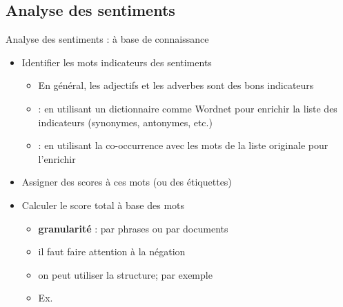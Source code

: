 \documentclass{KodeBook}
\begin{document}
\subsection{Analyse des sentiments}


Analyse des sentiments : à base de connaissance
\begin{itemize}
	\item Identifier les mots indicateurs des sentiments
	\begin{itemize}
		\item En général, les adjectifs et les adverbes sont des bons indicateurs
		\item {} : en utilisant un dictionnaire comme Wordnet pour enrichir la liste des indicateurs (synonymes, antonymes, etc.) 
		\item {} : en utilisant la co-occurrence avec les mots  de la liste originale pour l'enrichir 
	\end{itemize}
	\item Assigner des scores à ces mots (ou des étiquettes)
	\item Calculer le score total à  base des mots
	\begin{itemize}
		\item \textbf{granularité} : par phrases ou par documents 
		\item il faut faire attention à  la négation
		\item on peut utiliser la structure; par exemple 
		\item Ex. 
	\end{itemize}
\end{itemize}
\end{document}
